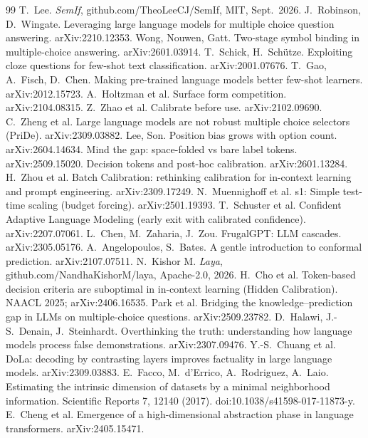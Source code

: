 \documentclass[11pt,a4paper]{article}
\begin{document}
\begin{thebibliography}{99}\small
{} T.~Lee. \emph{SemIf}, github.com/TheoLeeCJ/SemIf, MIT, Sept.~2026.
 J.~Robinson, D.~Wingate. Leveraging large language models for multiple choice question answering. arXiv:2210.12353.
 Wong, Nouwen, Gatt. Two-stage symbol binding in multiple-choice answering. arXiv:2601.03914.
 T.~Schick, H.~Schütze. Exploiting cloze questions for few-shot text classification. arXiv:2001.07676.
 T.~Gao, A.~Fisch, D.~Chen. Making pre-trained language models better few-shot learners. arXiv:2012.15723.
 A.~Holtzman et al. Surface form competition. arXiv:2104.08315.
 Z.~Zhao et al. Calibrate before use. arXiv:2102.09690.
 C.~Zheng et al. Large language models are not robust multiple choice selectors (PriDe). arXiv:2309.03882.
 Lee, Son. Position bias grows with option count. arXiv:2604.14634.
 Mind the gap: space-folded vs bare label tokens. arXiv:2509.15020.
 Decision tokens and post-hoc calibration. arXiv:2601.13284.
 H.~Zhou et al. Batch Calibration: rethinking calibration for in-context learning and prompt engineering. arXiv:2309.17249.
 N.~Muennighoff et al. s1: Simple test-time scaling (budget forcing). arXiv:2501.19393.
 T.~Schuster et al. Confident Adaptive Language Modeling (early exit with calibrated confidence). arXiv:2207.07061.
 L.~Chen, M.~Zaharia, J.~Zou. FrugalGPT: LLM cascades. arXiv:2305.05176.
 A.~Angelopoulos, S.~Bates. A gentle introduction to conformal prediction. arXiv:2107.07511.
 N.~Kishor M. \emph{Laya}, github.com/NandhaKishorM/laya, Apache-2.0, 2026.
 H.~Cho et al. Token-based decision criteria are suboptimal in in-context learning (Hidden Calibration). NAACL 2025; arXiv:2406.16535.
 Park et al. Bridging the knowledge--prediction gap in LLMs on multiple-choice questions. arXiv:2509.23782.
 D.~Halawi, J.-S.~Denain, J.~Steinhardt. Overthinking the truth: understanding how language models process false demonstrations. arXiv:2307.09476.
 Y.-S.~Chuang et al. DoLa: decoding by contrasting layers improves factuality in large language models. arXiv:2309.03883.
 E.~Facco, M.~d'Errico, A.~Rodriguez, A.~Laio. Estimating the intrinsic dimension of datasets by a minimal neighborhood information. Scientific Reports 7, 12140 (2017). doi:10.1038/s41598-017-11873-y.
 E.~Cheng et al. Emergence of a high-dimensional abstraction phase in language transformers. arXiv:2405.15471.

\end{thebibliography}
\end{document}
